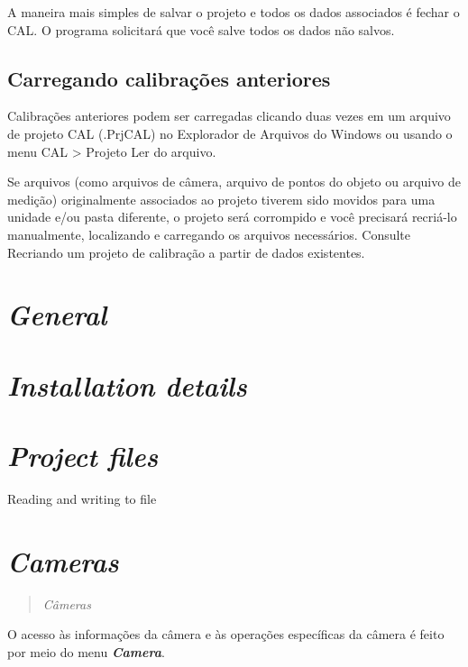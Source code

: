 \documentclass[
  12pt,
  letterpaper,
  DIV=11,
  numbers=noendperiod]{scrreprt}
\begin{document}
A maneira mais simples de salvar o projeto e todos os dados associados é
fechar o CAL. O programa solicitará que você salve todos os dados não
salvos.

\subsection{Carregando calibrações
anteriores}\label{carregando-calibrauxe7uxf5es-anteriores}

Calibrações anteriores podem ser carregadas clicando duas vezes em um
arquivo de projeto CAL (.PrjCAL) no Explorador de Arquivos do Windows ou
usando o menu CAL \textgreater{} Projeto \textbar{} Ler do arquivo.

Se arquivos (como arquivos de câmera, arquivo de pontos do objeto ou
arquivo de medição) originalmente associados ao projeto tiverem sido
movidos para uma unidade e/ou pasta diferente, o projeto será corrompido
e você precisará recriá-lo manualmente, localizando e carregando os
arquivos necessários. Consulte Recriando um projeto de calibração a
partir de dados existentes.

\section{\texorpdfstring{\emph{General}}{General}}\label{general}

\section{\texorpdfstring{\emph{Installation
details}}{Installation details}}\label{installation-details}

\section{\texorpdfstring{\emph{Project
files}}{Project files}}\label{project-files}

Reading and writing to file

\section{\texorpdfstring{\emph{Cameras}}{Cameras}}\label{sec-cameras}

\begin{quote}
\emph{Câmeras}
\end{quote}

O acesso às informações da câmera e às operações específicas da câmera é
feito por meio do menu \textbf{\emph{Camera}}.
\end{document}
